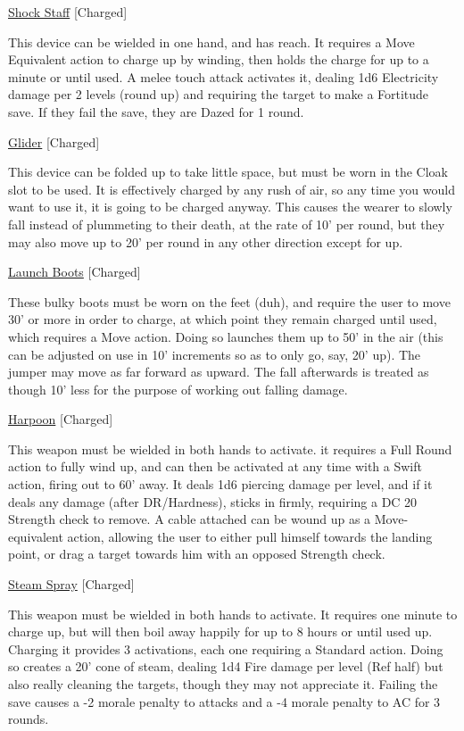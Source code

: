 \medskip\noindent\underline{Shock Staff} [Charged] 

\noindent This device can be wielded in one hand, and has reach. It requires a Move Equivalent action to charge up by winding, then holds the charge for up to a minute or until used. A melee touch attack activates it, dealing 1d6 Electricity damage per 2 levels (round up) and requiring the target to make a Fortitude save. If they fail the save, they are Dazed for 1 round. 

\medskip\noindent\underline{Glider} [Charged] 

\noindent This device can be folded up to take little space, but must be worn in the Cloak slot to be used. It is effectively charged by any rush of air, so any time you would want to use it, it is going to be charged anyway. This causes the wearer to slowly fall instead of plummeting to their death, at the rate of 10' per round, but they may also move up to 20' per round in any other direction except for up. 

\medskip\noindent\underline{Launch Boots} [Charged] 

\noindent These bulky boots must be worn on the feet (duh), and require the user to move 30' or more in order to charge, at which point they remain charged until used, which requires a Move action. Doing so launches them up to 50' in the air (this can be adjusted on use in 10' increments so as to only go, say, 20' up). The jumper may move as far forward as upward. The fall afterwards is treated as though 10' less for the purpose of working out falling damage. 

\medskip\noindent\underline{Harpoon} [Charged] 

\noindent This weapon must be wielded in both hands to activate. it requires a Full Round action to fully wind up, and can then be activated at any time with a Swift action, firing out to 60' away. It deals 1d6 piercing damage per level, and if it deals any damage (after DR/Hardness), sticks in firmly, requiring a DC 20 Strength check to remove. A cable attached can be wound up as a Move-equivalent action, allowing the user to either pull himself towards the landing point, or drag a target towards him with an opposed Strength check. 

\medskip\noindent\underline{Steam Spray} [Charged]
 
\noindent This weapon must be wielded in both hands to activate. It requires one minute to charge up, but will then boil away happily for up to 8 hours or until used up. Charging it provides 3 activations, each one requiring a Standard action. Doing so creates a 20' cone of steam, dealing 1d4 Fire damage per level (Ref half) but also really cleaning the targets, though they may not appreciate it. Failing the save causes a -2 morale penalty to attacks and a -4 morale penalty to AC for 3 rounds. 

